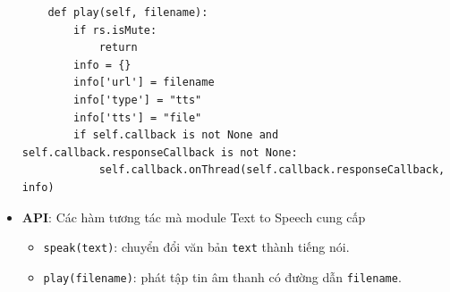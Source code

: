 \begin{itemize}
\begin{lstlisting}
    def play(self, filename):
        if rs.isMute:
            return
        info = {}
        info['url'] = filename
        info['type'] = "tts"
        info['tts'] = "file"
        if self.callback is not None and self.callback.responseCallback is not None:
            self.callback.onThread(self.callback.responseCallback, info)
\end{lstlisting}

\item \textbf{API}: Các hàm tương tác mà module Text to Speech cung cấp
\begin{itemize}
\item \lstinline{speak(text)}: chuyển đổi văn bản \lstinline{text} thành tiếng nói.
\item \lstinline{play(filename)}: phát tập tin âm thanh có đường dẫn \lstinline{filename}.
\end{itemize}
\end{itemize}
